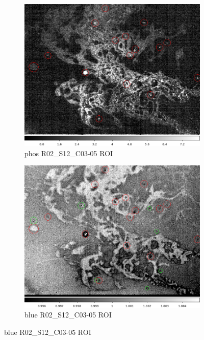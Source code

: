 \begin{figure}[!htbp]
\begin{subfigure}{0.30\textwidth}
\end{subfigure}
\newline
\begin{subfigure}{0.30\textwidth}
    \includegraphics[width=\textwidth]{figures/phosphorescence-survey/comp_phos_R02_S12_C03-5.png}
     \caption{phos  R02\_S12\_C03-05 ROI}
     \label{subfig:comp:phos:R02_S12_C03}
\end{subfigure}
\hfil
\begin{subfigure}{0.30\textwidth}
    \includegraphics[width=\textwidth]{figures/phosphorescence-survey/comp_blue_R02_S12_C03-5.png}
     \caption{blue  R02\_S12\_C03-05 ROI}

\end{subfigure}
\end{figure}
